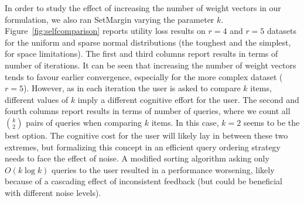 \documentclass{article}
\renewcommand\[{\begin{equation}}
\renewcommand\]{\end{equation}}
\newcommand{\vecvar}[1]{\ensuremath{\boldsymbol{#1}}}
\newcommand{\vx}{\vecvar{x}}
\newcommand{\stefano}[1]{{\bf \textcolor{green}{{\fbox{Stefano:} #1}}}}
\newcommand{\paolo}[1]{{\bf \textcolor{red}{{\fbox{Paolo:} #1}}}}
\begin{document}
In order to study the effect of increasing the number of weight
vectors in our formulation, we also ran {\sc SetMargin} varying the
parameter $k$. Figure~\ref{fig:selfcomparison} reports utility loss
results on $r\!=\!4$ and $r\!=\!5$ datasets for the uniform and sparse normal
distributions (the toughest and the simplest, for space limitations).
The first and third columns report results in terms of number of
iterations. It can be seen that increasing the number of weight
vectors tends to favour earlier convergence, especially for the more
complex dataset ($r=5$). However, as in each iteration the user is
asked to compare $k$ items, different values of $k$ imply a different
cognitive effort for the user. The second and fourth columns report
results in terms of number of queries, where we count all
$\binom{k}{2}$
pairs of queries when comparing $k$ items. In this case,
$k=2$ seems to be the best option. The cognitive cost for the user
will likely lay in between these two extremes, but formalizing this
concept in an efficient query ordering strategy needs to face the
effect of noise.  A modified sorting algorithm asking only
$O(k\log k)$ queries to the user resulted in a performance worsening,
likely because of a cascading effect of inconsistent feedback (but
could be beneficial with different noise levels).
\end{document}
